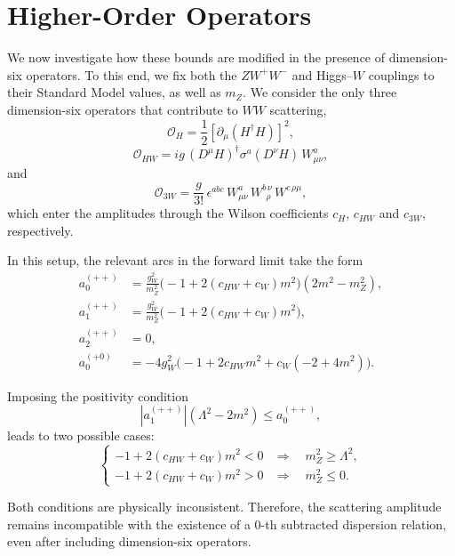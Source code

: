 \section{Higher-Order Operators}

We now investigate how these bounds are modified in the presence of dimension-six operators. To this end, we fix both the $ZW^+W^-$ and Higgs--$W$ couplings to their Standard Model values, as well as $m_Z$. We consider the only three dimension-six operators that contribute to $WW$ scattering,
\begin{equation}
\mathcal{O}_H
=
\frac{1}{2}
\left[
\partial_\mu \left(H^\dagger H\right)
\right]^2,
\end{equation}
\begin{equation}
\mathcal{O}_{HW}
=
i g\,
(D^\mu H)^\dagger
\sigma^a
(D^\nu H)\,
W^a_{\mu\nu},
\end{equation}
and
\begin{equation}
\mathcal{O}_{3W}
=
\frac{g}{3!}\,
\epsilon^{abc}\,
W^a_{\mu\nu}\,
W^{b\,\nu}_{\ \ \rho}\,
W^{c\,\rho\mu},
\end{equation}
which enter the amplitudes through the Wilson coefficients $c_H$, $c_{HW}$ and $c_{3W}$, respectively.


In this setup, the relevant arcs in the forward limit take the form
\begin{align}
    a_0^{(++)} &= \frac{g_W^2}{m_Z^2} \Big( -1 + 2 (c_{HW} + c_W) m^2 \Big) (2 m^2 - m_Z^2), \\
    a_1^{(++)} &= \frac{g_W^2}{m_Z^2} \Big( -1 + 2 (c_{HW} + c_W) m^2 \Big),\\
    a_2^{(++)} &= 0, \\
    a_0^{(+0)} &= -4g_W^2 \Big( -1 + 2 c_{HW} m^2 + c_W (-2 + 4m^2) \Big).
\end{align}

Imposing the positivity condition
\[
|a_1^{(++)}|(\Lambda^2 - 2m^2) \leq a_0^{(++)},
\]
leads to two possible cases:
\[
\begin{cases}
    -1 + 2 (c_{HW} + c_W)m^2 < 0
    &\Rightarrow\quad m_Z^2 \geq \Lambda^2, \\[4pt]
    -1 + 2 (c_{HW} + c_W)m^2 > 0
    &\Rightarrow\quad m_Z^2 \leq 0.
\end{cases}
\]

Both conditions are physically inconsistent. Therefore, the scattering amplitude remains incompatible with the existence of a 0-th subtracted dispersion relation, even after including dimension-six operators.

